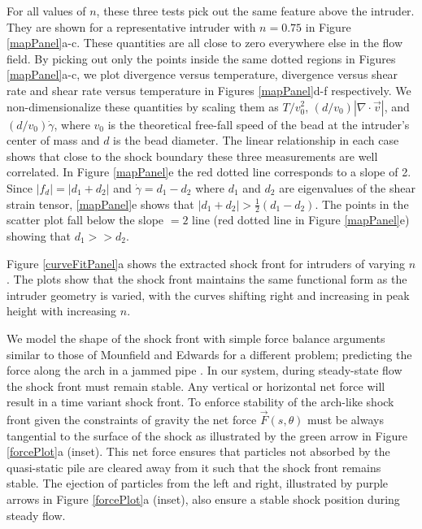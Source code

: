 For all values of $n$, these three tests pick out the same feature above the intruder. They are shown for a representative intruder with $n=0.75$ in Figure \ref{mapPanel}a-c.  These quantities are all close to zero everywhere else in the flow field. By picking out only the points inside the same dotted regions in Figures \ref{mapPanel}a-c, we plot divergence versus temperature, divergence versus shear rate and shear rate versus temperature in Figures \ref{mapPanel}d-f respectively. We non-dimensionalize these quantities by scaling them as $T/v_{0}^2$, $(d/v_{0}) | \nabla \cdot \vec{v}|$, and $(d/v_{0})\dot \gamma$, where $v_{0}$ is the theoretical free-fall speed of the bead at the intruder's center of mass and $d$ is the bead diameter.  The linear relationship in each case shows that close to the shock boundary these three measurements are well correlated. In Figure \ref{mapPanel}e the red dotted line corresponds to a slope of 2. Since $|f_{d}|=|d_{1}+d_{2}|$ and $\dot{\gamma}=d_{1}-d_{2}$ where $d_{1}$ and $d_{2}$ are eigenvalues of the shear strain tensor, \ref{mapPanel}e shows that $|d_{1}+d_{2}|>\frac{1}{2}(d_{1}-d_{2})$. The points in the scatter plot fall below the slope $=2$ line (red dotted line in Figure \ref{mapPanel}e) showing that $d_{1} >> d_{2}$. 

Figure \ref{curveFitPanel}a shows the extracted shock front for intruders of varying $n$. The plots show that the shock front maintains the same functional form as the intruder geometry is varied, with the curves shifting right and increasing in peak height with increasing $n$. 

We model the shape of the shock front with simple force balance arguments similar to those of Mounfield and Edwards for a different problem; predicting the force along the arch in a jammed pipe \cite{mounfield_theoretical_1996}. In our system, during steady-state flow the shock front must remain stable. Any vertical or horizontal net force will result in a time variant shock front. To enforce stability of the arch-like shock front given the constraints of gravity the net force $\vec{F}(s,\theta)$ must be always tangential to the surface of the shock as illustrated by the green arrow in Figure \ref{forcePlot}a (inset). This net force ensures that particles not absorbed by the quasi-static pile are cleared away from it such that the shock front remains stable. The ejection of particles from the left and right, illustrated by purple arrows in Figure \ref{forcePlot}a (inset), also ensure a stable shock position during steady flow. 

